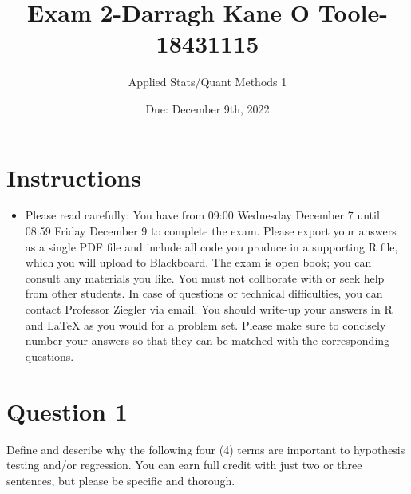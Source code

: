 \documentclass[12pt,letterpaper]{article}
\title{Exam 2-Darragh Kane O Toole-18431115 }
\date{Due: December 9th, 2022}
\author{Applied Stats/Quant Methods 1}
\begin{document}
	\maketitle
	\section*{Instructions}
	\begin{itemize}
		\item Please read carefully: You have from 09:00 Wednesday December 7 until 08:59
		Friday December 9 to complete the exam. Please export your answers as a single
		PDF file and include all code you produce in a supporting R file, which you will
		upload to Blackboard. The exam is open book; you can consult any materials you
		like. You must not collborate with or seek help from other students. In case
		of questions or technical difficulties, you can contact Professor Ziegler via email. You
		should write-up your answers in R and LaTeX as you would for a problem set. Please
		make sure to concisely number your answers so that they can be matched with the
		corresponding questions.
	\end{itemize}
	
	
	
	\vspace{.5cm}
	\section*{Question 1}
	\vspace{.25cm}
	\noindent 	
	Define and describe why the following four (4) terms are important to hypothesis testing
	and/or regression. You can earn full credit with just two or three sentences, but please be
	specific and thorough.
	 
\end{document}
